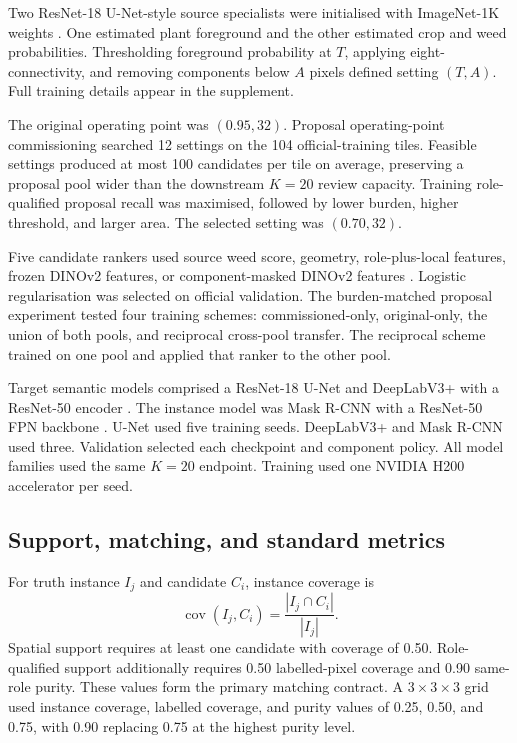 \documentclass[preprint,12pt]{elsarticle}
\begin{document}
Two ResNet-18 U-Net-style source specialists were initialised with ImageNet-1K weights \cite{he2016resnet}. One estimated plant foreground and the other estimated crop and weed probabilities. Thresholding foreground probability at $T$, applying eight-connectivity, and removing components below $A$ pixels defined setting $(T,A)$. Full training details appear in the supplement.

The original operating point was $(0.95,32)$. Proposal operating-point commissioning searched 12 settings on the 104 official-training tiles. Feasible settings produced at most 100 candidates per tile on average, preserving a proposal pool wider than the downstream $K=20$ review capacity. Training role-qualified proposal recall was maximised, followed by lower burden, higher threshold, and larger area. The selected setting was $(0.70,32)$.

Five candidate rankers used source weed score, geometry, role-plus-local features, frozen DINOv2 features, or component-masked DINOv2 features \cite{oquab2024dinov2}. Logistic regularisation was selected on official validation. The burden-matched proposal experiment tested four training schemes: commissioned-only, original-only, the union of both pools, and reciprocal cross-pool transfer. The reciprocal scheme trained on one pool and applied that ranker to the other pool.

Target semantic models comprised a ResNet-18 U-Net and DeepLabV3+ with a ResNet-50 encoder \cite{chen2018deeplabv3plus}. The instance model was Mask R-CNN with a ResNet-50 FPN backbone \cite{he2017maskrcnn}. U-Net used five training seeds. DeepLabV3+ and Mask R-CNN used three. Validation selected each checkpoint and component policy. All model families used the same $K=20$ endpoint. Training used one NVIDIA H200 accelerator per seed.

\subsection{Support, matching, and standard metrics}

For truth instance $I_j$ and candidate $C_i$, instance coverage is
\begin{equation}
\operatorname{cov}(I_j,C_i)=\frac{|I_j\cap C_i|}{|I_j|}.
\end{equation}
Spatial support requires at least one candidate with coverage of 0.50. Role-qualified support additionally requires 0.50 labelled-pixel coverage and 0.90 same-role purity. These values form the primary matching contract. A $3\times3\times3$ grid used instance coverage, labelled coverage, and purity values of 0.25, 0.50, and 0.75, with 0.90 replacing 0.75 at the highest purity level.
\end{document}
